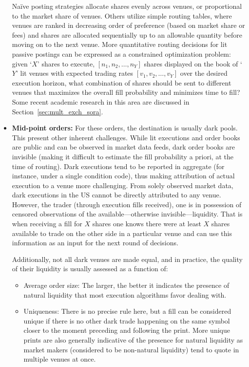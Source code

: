 \begin{itemize}
Na\"ive posting strategies allocate shares evenly across venues, or proportional to the market share of venues. Others utilize simple routing tables, where venues are ranked in decreasing order of preference (based on market share or fees) and shares are allocated sequentially up to an allowable quantity before moving on to the next venue. More quantitative routing decisions for lit passive postings can be expressed as a constrained optimization problem: given `$X$' shares to execute, $[n_1, n_2, \ldots, n_Y]$ shares displayed on the book of `$Y$' lit venues with expected trading rates $[v_1, v_2, \ldots, v_Y]$ over the desired execution horizon, what combination of shares should be sent to different venues that maximizes the overall fill probability and minimizes time to fill? Some recent academic research in this area are discussed in Section~\ref{sec:mult_exch_sora}.


\item \textbf{Mid-point orders:} For these orders, the destination is usually dark pools. This present other inherent challenges. While lit executions and order books are public and can be observed in market data feeds, dark order books are invisible (making it difficult to estimate the fill probability a priori, at the time of routing). Dark executions tend to be reported in aggregate (for instance, under a single condition code), thus making attribution of actual execution to a venue more challenging. From solely observed market data, dark executions in the US cannot be directly attributed to any venue. However, the trader (through execution fills received), one is in possession of censored observations of the available---otherwise invisible---liquidity. That is when receiving a fill for $X$ shares one knows there were at least $X$ shares available to trade on the other side in a particular venue and can use this information as an input for the next round of decisions. 


Additionally, not all dark venues are made equal, and in practice, the quality of their liquidity is usually assessed as a function of: 

\begin{itemize}
\item Average order size: The larger, the better it indicates the presence of natural liquidity that most execution algorithms favor dealing with.

\item Uniqueness: There is no precise rule here, but a fill can be considered unique if there is no other dark trade happening on the same symbol closer to the moment preceding and following the print. More unique prints are also generally indicative of the presence for natural liquidity as market makers (considered to be non-natural liquidity) tend to quote in multiple venues at once.


\end{itemize}
\end{itemize}
